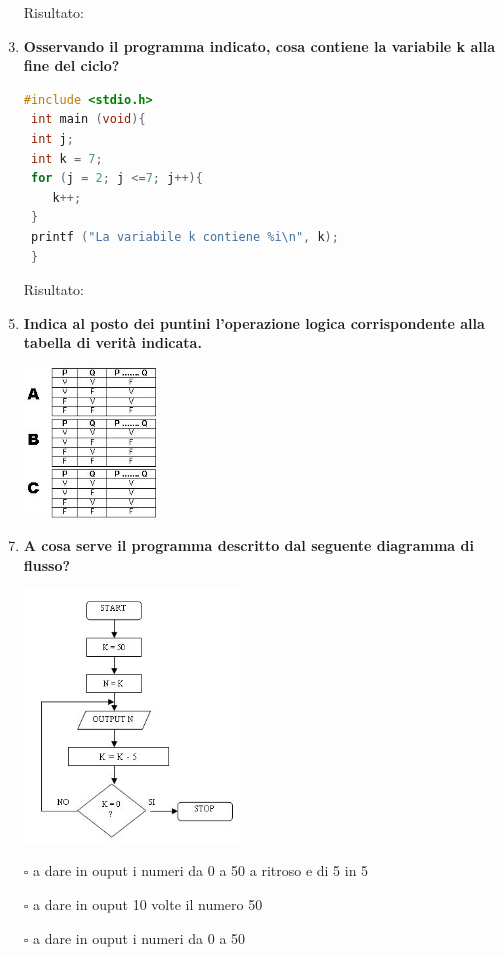 \documentclass[11pt]{article}
\begin{document}
\begin{enumerate}
Risultato: 
\item [\nonumber]
\item {\bf Osservando il programma indicato, cosa contiene la variabile k alla fine del ciclo?}
\begin{lstlisting}[language=c]
#include <stdio.h>
 int main (void){
 int j;
 int k = 7;
 for (j = 2; j <=7; j++){
 	k++;
 }
 printf ("La variabile k contiene %i\n", k);
 }
\end{lstlisting} 

Risultato: 
\item [\nonumber]
\item{\bf Indica al posto dei puntini l'operazione logica corrispondente alla tabella di verit\`{a} indicata.}
\begin{center}
\includegraphics[width=0.28\textwidth]{mm11_connettivi}
\end{center}


\item [\nonumber]
\item {\bf A cosa serve il programma descritto dal seguente diagramma di flusso?}
\begin{center}
\includegraphics[width=0.45\textwidth]{mm4_fig5.jpg}
\end{center}

\item[$\square$]a dare in ouput i numeri da 0 a 50 a ritroso e di 5 in 5
\item[$\square$]a dare in ouput 10 volte il numero 50
\item[$\square$]a dare in ouput i numeri da 0 a 50


\end{enumerate}
\end{document}
